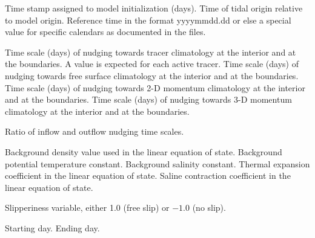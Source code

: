\begin{klist}
    \mbox{}
     \begin{klist}
          Time stamp assigned to model initialization
     (days).
          Time of tidal origin relative to model
       origin.
         Reference time in the format yyyymmdd.dd or
       else a special value for specific calendars as documented in the
        files.
     \end{klist}
   \mbox{}
     \begin{klist}
           Time scale (days) of nudging towards
     tracer climatology at the interior and at the boundaries.
     A value is expected for each active tracer.
           Time scale (days) of nudging towards
     free surface climatology at the interior and at the boundaries.
           Time scale (days) of nudging towards
     2-D momentum climatology at the interior and at the boundaries.
           Time scale (days) of nudging towards
     3-D momentum climatology at the interior and at the boundaries.
     \end{klist}
    \mbox{}
     \begin{klist}
          Ratio of inflow and outflow nudging time scales.
     \end{klist}
    \mbox{}
     \begin{klist}
              Background density value used in
    the linear equation of state.
              Background potential temperature constant.
              Background salinity constant.
           Thermal expansion coefficient in the linear
    equation of state.
           Saline contraction coefficient in the linear
    equation of state.
     \end{klist}
    \mbox{}
     \begin{klist}
          Slipperiness variable, either 1.0 (free
     slip) or $-1.0$ (no slip).
     \end{klist}
    \mbox{}
     \begin{klist}
        Starting day.
        Ending day.
     \end{klist}
    \mbox{}
     \begin{klist}

\end{klist}
\end{klist}
